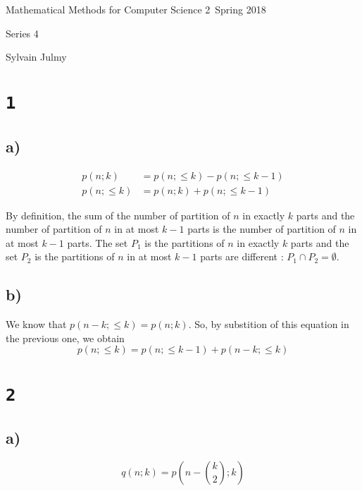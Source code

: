 \documentclass[a4paper,11pt]{report}
\author{Sylvain Julmy}
\date{\today}
\begin{document}
\begin{center}
  \Large{
    Mathematical Methods for Computer Science 2\
    Spring 2018
  }
  \noindent\makebox[\linewidth]{\rule{\linewidth}{0.4pt}}

  Series 4
  \vspace*{1.4cm}

  Sylvain Julmy
  
  \noindent\makebox[\linewidth]{\rule{\linewidth}{0.4pt}}
\end{center}

\section*{\texttt{1}}

\subsection*{a)}

\begin{align*}
  p(n;k) &= p(n;\leq k) - p(n;\leq k-1) \\
  p(n;\leq k) &= p(n;k) + p(n;\leq k-1)
\end{align*}

By definition, the sum of the number of partition of $n$ in exactly $k$ parts
and the number of partition of $n$ in at most $k-1$ parts is the number of
partition of $n$ in at most $k-1$ parts. The set $P_1$ is the partitions of $n$
in exactly $k$ parts and the set $P_2$ is the partitions of $n$ in at most $k-1$
parts are different : $P_1 \cap P_2 = \emptyset$.

\subsection*{b)}

We know that $p(n-k;\leq k) = p(n;k)$. So, by substition of this equation
in the previous one, we obtain
\[
  p(n;\leq k) = p(n;\leq k-1) + p(n-k;\leq k)
\]

\section*{\texttt{2}}

\subsection*{a)}

\[
  q(n;k) = p(n-\binom{k}{2};k)
\]
\end{document}
